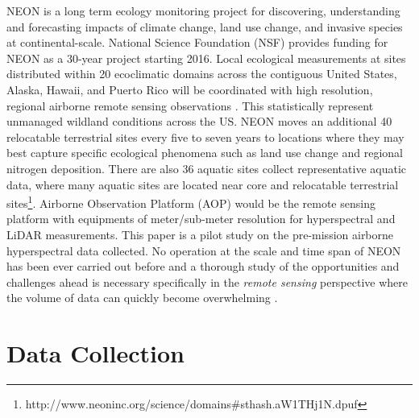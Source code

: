 \documentclass[remotesensing,article,accept,moreauthors,pdftex,12pt,a4paper]{mdpi}
\begin{document}
NEON is a long term ecology monitoring project for discovering, understanding and forecasting impacts of climate change, land use change, and invasive species at continental-scale. 
National Science Foundation (NSF) provides funding for NEON as a 30-year project starting 2016. 
Local ecological measurements at sites distributed within 20 ecoclimatic domains across the contiguous United States, Alaska, Hawaii, and Puerto Rico will be coordinated with high resolution, regional airborne remote sensing observations \cite{kampe2010neon}.
 This statistically represent unmanaged wildland conditions across the US. 
 NEON moves an additional 40 relocatable terrestrial sites every five to seven years to locations where they may best capture specific ecological phenomena such as land use change and regional nitrogen deposition. 
 There are also 36 aquatic sites collect representative aquatic data, where many aquatic sites are located near core and relocatable terrestrial sites\footnote{http://www.neoninc.org/science/domains\#sthash.aW1THj1N.dpuf}. 
 Airborne Observation Platform (AOP) would be the remote sensing platform with equipments of meter/sub-meter resolution for hyperspectral and LiDAR measurements. 
 This paper is a pilot study on the pre-mission airborne hyperspectral data collected. 
 No operation at the scale and time span of NEON has been ever carried out before and a thorough study of the opportunities and challenges ahead is necessary specifically in the \textit{remote sensing} perspective where the volume of data can quickly become overwhelming \cite{neon2010aopdatarelease}.

\section{Data Collection}
\end{document}
